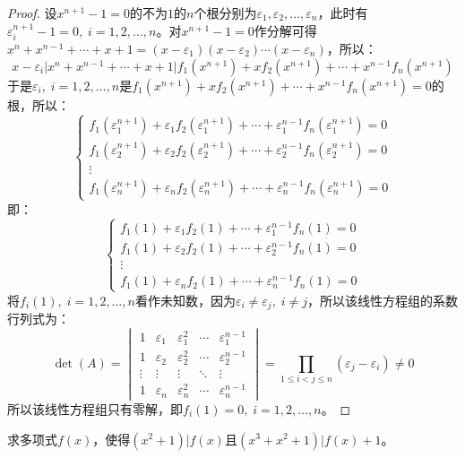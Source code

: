 \begin{proof}
	设$x^{n+1}-1=0$的不为$1$的$n$个根分别为$\varepsilon_1,\varepsilon_2,\dots,\varepsilon_n$，此时有$\varepsilon_i^{n+1}-1=0,\;i=1,2,\dots,n$。对$x^{n+1}-1=0$作分解可得$x^n+x^{n-1}+\cdots+x+1=(x-\varepsilon_1)(x-\varepsilon_2)\cdots(x-\varepsilon_n)$，所以：
	\begin{equation*}
		x-\varepsilon_i\Big|x^n+x^{n-1}+\cdots+x+1\Big|f_1(x^{n+1})+xf_2(x^{n+1})+\cdots+x^{n-1}f_n(x^{n+1})
	\end{equation*}
	于是$\varepsilon_i,\;i=1,2,\dots,n$是$f_1(x^{n+1})+xf_2(x^{n+1})+\cdots+x^{n-1}f_n(x^{n+1})=0$的根，所以：
	\[
	\begin{cases}
		f_1(\varepsilon_1^{n+1}) + \varepsilon_1 f_2(\varepsilon_1^{n+1}) + \cdots + \varepsilon_1^{n-1} f_n(\varepsilon_1^{n+1}) = 0 \\
		f_1(\varepsilon_2^{n+1}) + \varepsilon_2 f_2(\varepsilon_2^{n+1}) + \cdots + \varepsilon_2^{n-1} f_n(\varepsilon_2^{n+1}) = 0 \\
		\vdots \\
		f_1(\varepsilon_n^{n+1}) + \varepsilon_n f_2(\varepsilon_n^{n+1}) + \cdots + \varepsilon_n^{n-1} f_n(\varepsilon_n^{n+1}) = 0
	\end{cases}
	\]
	即：
	\[
	\begin{cases}
		f_1(1) + \varepsilon_1 f_2(1) + \cdots + \varepsilon_1^{n-1} f_n(1) = 0 \\
		f_1(1) + \varepsilon_2 f_2(1) + \cdots + \varepsilon_2^{n-1} f_n(1) = 0 \\
		\vdots \\
		f_1(1) + \varepsilon_n f_2(1) + \cdots + \varepsilon_n^{n-1} f_n(1) = 0
	\end{cases}
	\]
	将$f_i(1),\;i=1,2,\dots,n$看作未知数，因为$\varepsilon_i\ne\varepsilon_j,\;i\ne j$，所以该线性方程组的系数行列式为：
	\[
	\det(A) =
	\begin{vmatrix}
		1 & \varepsilon_1 & \varepsilon_1^2 & \cdots & \varepsilon_1^{n-1} \\
		1 & \varepsilon_2 & \varepsilon_2^2 & \cdots & \varepsilon_2^{n-1} \\
		\vdots & \vdots & \vdots & \ddots & \vdots \\
		1 & \varepsilon_n & \varepsilon_n^2 & \cdots & \varepsilon_n^{n-1}
	\end{vmatrix}
	= \prod_{1 \leq i < j \leq n} (\varepsilon_j - \varepsilon_i)
	\ne 0
	\]
	所以该线性方程组只有零解，即$f_i(1)=0,\;i=1,2,\dots,n$。
\end{proof}
\begin{theorem}
	求多项式$f(x)$，使得$(x^2+1)|f(x)$且$(x^3+x^2+1)|f(x)+1$。
\end{theorem}
